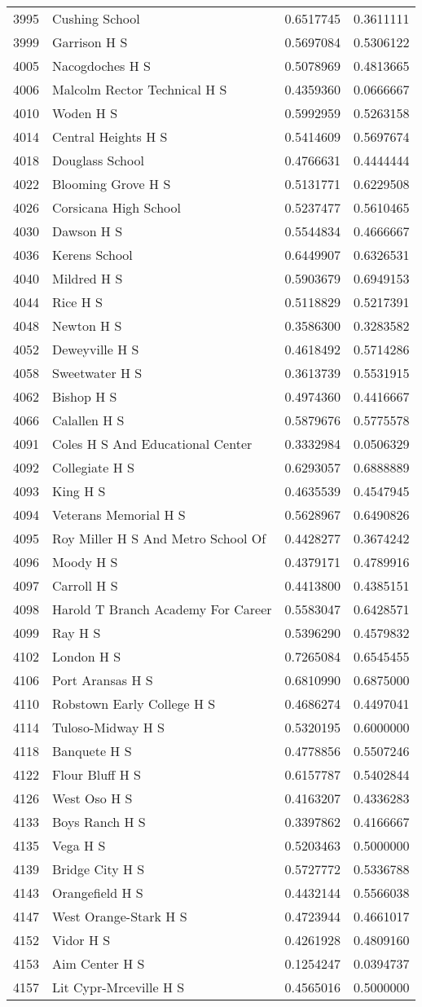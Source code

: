\documentclass[
]{article}
\begin{document}
\begin{longtable}[]{@{}llrr@{}}
3995 & Cushing School & 0.6517745 & 0.3611111\tabularnewline
3999 & Garrison H S & 0.5697084 & 0.5306122\tabularnewline
4005 & Nacogdoches H S & 0.5078969 & 0.4813665\tabularnewline
4006 & Malcolm Rector Technical H S & 0.4359360 &
0.0666667\tabularnewline
4010 & Woden H S & 0.5992959 & 0.5263158\tabularnewline
4014 & Central Heights H S & 0.5414609 & 0.5697674\tabularnewline
4018 & Douglass School & 0.4766631 & 0.4444444\tabularnewline
4022 & Blooming Grove H S & 0.5131771 & 0.6229508\tabularnewline
4026 & Corsicana High School & 0.5237477 & 0.5610465\tabularnewline
4030 & Dawson H S & 0.5544834 & 0.4666667\tabularnewline
4036 & Kerens School & 0.6449907 & 0.6326531\tabularnewline
4040 & Mildred H S & 0.5903679 & 0.6949153\tabularnewline
4044 & Rice H S & 0.5118829 & 0.5217391\tabularnewline
4048 & Newton H S & 0.3586300 & 0.3283582\tabularnewline
4052 & Deweyville H S & 0.4618492 & 0.5714286\tabularnewline
4058 & Sweetwater H S & 0.3613739 & 0.5531915\tabularnewline
4062 & Bishop H S & 0.4974360 & 0.4416667\tabularnewline
4066 & Calallen H S & 0.5879676 & 0.5775578\tabularnewline
4091 & Coles H S And Educational Center & 0.3332984 &
0.0506329\tabularnewline
4092 & Collegiate H S & 0.6293057 & 0.6888889\tabularnewline
4093 & King H S & 0.4635539 & 0.4547945\tabularnewline
4094 & Veterans Memorial H S & 0.5628967 & 0.6490826\tabularnewline
4095 & Roy Miller H S And Metro School Of & 0.4428277 &
0.3674242\tabularnewline
4096 & Moody H S & 0.4379171 & 0.4789916\tabularnewline
4097 & Carroll H S & 0.4413800 & 0.4385151\tabularnewline
4098 & Harold T Branch Academy For Career & 0.5583047 &
0.6428571\tabularnewline
4099 & Ray H S & 0.5396290 & 0.4579832\tabularnewline
4102 & London H S & 0.7265084 & 0.6545455\tabularnewline
4106 & Port Aransas H S & 0.6810990 & 0.6875000\tabularnewline
4110 & Robstown Early College H S & 0.4686274 & 0.4497041\tabularnewline
4114 & Tuloso-Midway H S & 0.5320195 & 0.6000000\tabularnewline
4118 & Banquete H S & 0.4778856 & 0.5507246\tabularnewline
4122 & Flour Bluff H S & 0.6157787 & 0.5402844\tabularnewline
4126 & West Oso H S & 0.4163207 & 0.4336283\tabularnewline
4133 & Boys Ranch H S & 0.3397862 & 0.4166667\tabularnewline
4135 & Vega H S & 0.5203463 & 0.5000000\tabularnewline
4139 & Bridge City H S & 0.5727772 & 0.5336788\tabularnewline
4143 & Orangefield H S & 0.4432144 & 0.5566038\tabularnewline
4147 & West Orange-Stark H S & 0.4723944 & 0.4661017\tabularnewline
4152 & Vidor H S & 0.4261928 & 0.4809160\tabularnewline
4153 & Aim Center H S & 0.1254247 & 0.0394737\tabularnewline
4157 & Lit Cypr-Mrceville H S & 0.4565016 & 0.5000000\tabularnewline

\end{longtable}
\end{document}
